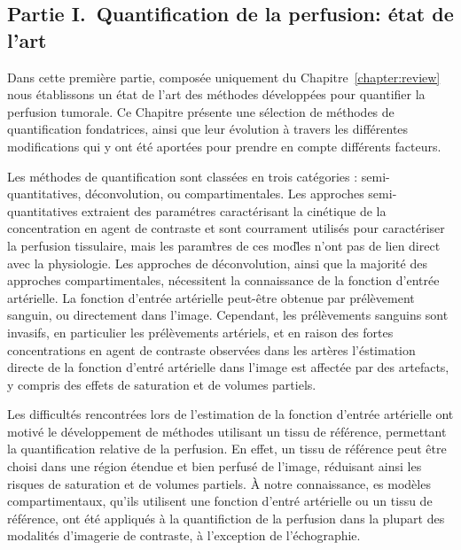\begin{otherlanguage}{francais}
\subsection*{Partie I.~Quantification de la perfusion: \'etat de l'art}
Dans cette premi\`ere partie, compos\'ee uniquement du Chapitre~\ref{chapter:review} nous \'etablissons un \'etat de l'art des m\'ethodes d\'evelopp\'ees pour quantifier la perfusion tumorale.
Ce Chapitre pr\'esente une s\'election de m\'ethodes de quantification fondatrices, ainsi que leur \'evolution \`a travers les diff\'erentes modifications qui y ont \'et\'e aport\'ees pour prendre en compte diff\'erents facteurs. 

Les m\'ethodes de quantification sont class\'ees en trois cat\'egories : semi-quantitatives, d\'econvolution, ou compartimentales.
Les approches semi-quantitatives extraient des param\'etres caract\'erisant la cin\'etique de la concentration en agent de contraste et sont courrament utilis\'es pour caract\'eriser la perfusion tissulaire, mais les param\`tres de ces mod\`les n'ont pas de lien direct avec la physiologie.
Les approches de d\'econvolution, ainsi que la majorit\'e des approches compartimentales, n\'ecessitent la connaissance de la fonction d'entr\'ee art\'erielle.
La fonction d'entr\'ee art\'erielle peut-\^etre obtenue par pr\'el\`evement sanguin, ou directement dans l'image. 
Cependant, les pr\'el\`evements sanguins sont invasifs, en particulier les pr\'el\`evements art\'eriels, et en raison des fortes concentrations en agent de contraste observ\'ees dans les art\`eres l'\'estimation directe de la fonction d'entr\'e art\'erielle dans l'image est affect\'ee par des artefacts, y compris des effets de saturation et de volumes partiels.

Les difficult\'es rencontr\'ees lors de l'estimation de la fonction d'entr\'ee art\'erielle ont motiv\'e le d\'eveloppement de m\'ethodes utilisant un tissu de r\'ef\'erence, permettant la quantification relative de la perfusion.
En effet, un tissu de r\'ef\'erence peut \^etre choisi dans une r\'egion \'etendue et bien perfus\'e de l'image, r\'eduisant ainsi les risques de saturation et de volumes partiels.
\`A notre connaissance, es mod\`eles compartimentaux, qu'ils utilisent une fonction d'entr\'e art\'erielle ou un tissu de r\'ef\'erence, ont \'et\'e appliqu\'es \`a la quantifiction de la perfusion dans la plupart des modalit\'es d'imagerie de contraste, \`a l'exception de l'\'echographie.


\end{otherlanguage}

